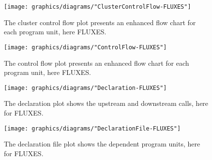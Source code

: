 \documentclass[11pt, oneside]{article}   	%
\begin{document}
\begin{figure}[htbp] %
   \centering
   \texttt{[image: graphics/diagrams/"ClusterControlFlow-FLUXES"]} 
   \caption{The cluster control flow plot presents an enhanced flow chart for each program unit, here FLUXES.}
   \label{fig:ClusterControlFlow-FLUXES}
\end{figure}

\begin{figure}[htbp] %
   \centering
   \texttt{[image: graphics/diagrams/"ControlFlow-FLUXES"]} 
   \caption{The control flow plot presents an enhanced flow chart for each program unit, here FLUXES.}
   \label{fig:ControlFlow-FLUXES}
\end{figure}

\begin{figure}[htbp] %
   \centering
   \texttt{[image: graphics/diagrams/"Declaration-FLUXES"]} 
   \caption{The declaration plot shows the upstream and downstream calls, here for FLUXES.}
   \label{fig:Declaration-FLUXES}
\end{figure}

\begin{figure}[htbp] %
   \centering
   \texttt{[image: graphics/diagrams/"DeclarationFile-FLUXES"]} 
   \caption{The declaration file plot shows the dependent program units, here for FLUXES.}
   \label{fig:DeclarationFile-FLUXES}
\end{figure}
\end{document}
